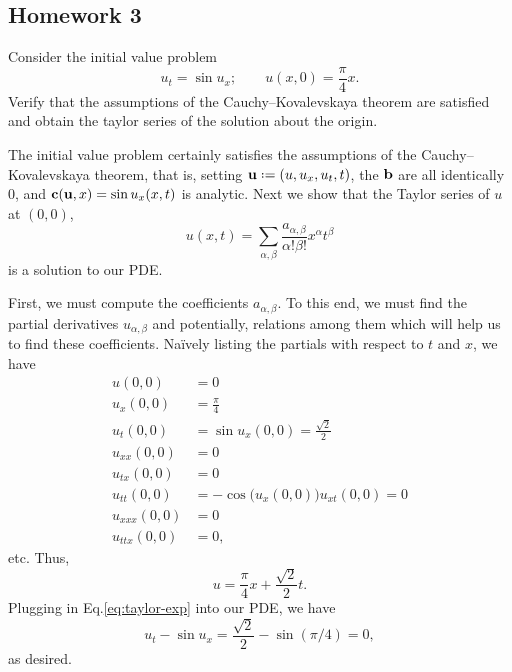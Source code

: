 \subsection{Homework 3}
\begin{problem}
  Consider the initial value problem
  \[
    u_t=\sin u_x;\qquad u(x,0)=\frac{\pi}{4}x.
  \]
  Verify that the assumptions of the Cauchy--Kovalevskaya theorem are
  satisfied and obtain the taylor series of the solution about the origin.
\end{problem}
\begin{solution}
  The initial value problem certainly satisfies the assumptions of the
  Cauchy--Kovalevskaya theorem, that is, setting
  \(\bfu\defeq(u,u_x,u_t,t)\), the \(\mathbf{b}\) are all identically \(0\), and
  \(\mathbf{c}(\mathbf{u},x)=\sin u_x(x,t)\) is analytic. Next we show that the Taylor
  series of \(u\) at \((0,0)\),
  \[
    u(x,t)=\sum_{\alpha,\beta} \frac{a_{\alpha,\beta}}{\alpha!\beta!}
    x^\alpha t^\beta
  \]
  is a solution to our PDE.

  First, we must compute the coefficients \(a_{\alpha,\beta}\). To this
  end, we must find the partial derivatives \(u_{\alpha,\beta}\) and
  potentially, relations among them which will help us to find these
  coefficients. Naïvely listing the partials with respect to \(t\) and
  \(x\), we have
  \begin{align*}
    u(0,0)&=0\\
    u_x(0,0)&=\frac{\pi}{4}\\
    u_t(0,0)&=\sin u_x(0,0)=\frac{\sqrt{2}}{2}\\
    u_{xx}(0,0)&=0\\
    u_{tx}(0,0)&=0\\
    u_{tt}(0,0)&=-\cos\bigl(u_x(0,0)\bigr)u_{xt}(0,0)=0\\
    u_{xxx}(0,0)&=0\\
    u_{ttx}(0,0)&=0,
  \end{align*}
  etc. Thus,
  \begin{equation}
    \label{eq:taylor-exp}
    u=\frac{\pi}{4}x+\frac{\sqrt{2}}{2}t.
  \end{equation}
  Plugging in Eq.\@ \eqref{eq:taylor-exp} into our PDE, we have
  \[
    u_t-\sin u_x=\frac{\sqrt{2}}{2}-\sin(\pi/4)=0,
  \]
  as desired.
\end{solution}

